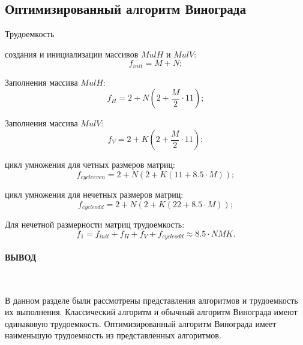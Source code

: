 \subsection{Оптимизированный алгоритм Винограда}

Трудоемкость
\begin{itemize}
    \itemm создания и инициализации массивов $MulH$ и $MulV$:
    \begin{equation}
        f_{init} = M + N;
    \end{equation}

    \itemm Заполнения массива $MulH$:
     \begin{equation}
        f_H = 2 + N(2 + \frac{M}{2}\cdot 11);
    \end{equation}

    \itemm Заполнения массива $MulV$:
     \begin{equation}
        f_V = 2 + K(2 + \frac{M}{2}\cdot 11);
    \end{equation}

    \itemm цикл умножения для четных размеров матриц:
    \begin{equation}
        f_{cycle even} = 2 + N(2 + K(11 + 8.5\cdot M));
    \end{equation}

    \itemm цикл умножения для нечетных размеров матриц:
    \begin{equation}
        f_{cycle odd} = 2 + N(2 + K(22 + 8.5\cdot M));
    \end{equation}

\end{itemize}

Для нечетной размерности матриц трудоемкость:
\begin{equation}
    f_{1} = f_{init} + f_H + f_V + f_{cycle odd} \approx 8.5\cdot NMK.
\end{equation}

\paragraph*{ВЫВОД} ${}$ \newline

В данном разделе были рассмотрены представления алгоритмов и трудоемкость их выполнения.
Классический алгоритм и обычный алгоритм Винограда имеют одинаковую трудоемкость.
Оптимизированный алгоритм Винограда имеет наименьшую трудоемкость из представленных алгоритмов.

